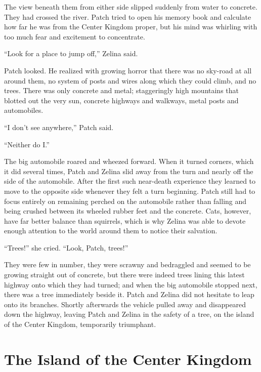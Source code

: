 \documentclass[ebook,oneside,openany,17pt]{memoir}
\newenvironment{tolerant}[1]{%
  \par\tolerance=#1\relax
}{%
  \par
}
\begin{document}
The view beneath them from either side slipped suddenly from water to
concrete. They had crossed the river. Patch tried to open his memory
book and calculate how far he was from the Center Kingdom proper, but
his mind was whirling with too much fear and excitement to
concentrate.

“Look for a place to jump off,” Zelina said.

\begin{tolerant}{2000}
Patch looked. He realized with growing horror that there was no
sky-road at all around them, no system of posts and wires along which
they could climb, and no trees. There was only concrete and metal;
staggeringly high mountains that blotted out the very sun, concrete
highways and walkways, metal posts and automobiles.
\end{tolerant}

“I don’t see anywhere,” Patch said.

“Neither do I.”

\begin{tolerant}{500}
The big automobile roared and wheezed forward. When it turned corners,
which it did several times, Patch and Zelina slid away from the turn
and nearly off the side of the automobile. After the first such
near-death experience they learned to move to the opposite side
whenever they felt a turn beginning. Patch still had to focus entirely
on remaining perch\-ed on the automobile rather than falling and being
crushed between its wheeled rubber feet and the concrete. Cats,
however, have far better balance than squirrels, which is why Zelina
was able to devote enough attention to the world around them to notice
their salvation.
\end{tolerant}

“Trees!” she cried. “Look, Patch, trees!”

They were few in number, they were scrawny and bedraggled and seemed
to be growing straight out of concrete, but there were indeed trees
lining this latest highway onto which they had turned; and when the
big automobile stopped next, there was a tree immediately beside
it. Patch and Zelina did not hesitate to leap onto its
branches. Shortly afterwards the vehicle pulled away and disappeared
down the highway, leaving Patch and Zelina in the safety of a tree, on
the island of the Center Kingdom, temporarily triumphant.


\chapter{The Island of the Center Kingdom}
\end{document}
